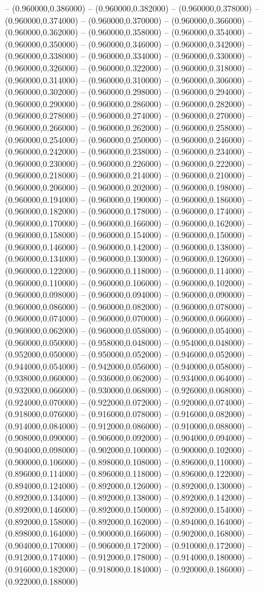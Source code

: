 -- (0.960000,0.386000) -- (0.960000,0.382000) -- (0.960000,0.378000) -- (0.960000,0.374000) -- (0.960000,0.370000) -- (0.960000,0.366000) -- (0.960000,0.362000) -- (0.960000,0.358000) -- (0.960000,0.354000) -- (0.960000,0.350000) -- (0.960000,0.346000) -- (0.960000,0.342000) -- (0.960000,0.338000) -- (0.960000,0.334000) -- (0.960000,0.330000) -- (0.960000,0.326000) -- (0.960000,0.322000) -- (0.960000,0.318000) -- (0.960000,0.314000) -- (0.960000,0.310000) -- (0.960000,0.306000) -- (0.960000,0.302000) -- (0.960000,0.298000) -- (0.960000,0.294000) -- (0.960000,0.290000) -- (0.960000,0.286000) -- (0.960000,0.282000) -- (0.960000,0.278000) -- (0.960000,0.274000) -- (0.960000,0.270000) -- (0.960000,0.266000) -- (0.960000,0.262000) -- (0.960000,0.258000) -- (0.960000,0.254000) -- (0.960000,0.250000) -- (0.960000,0.246000) -- (0.960000,0.242000) -- (0.960000,0.238000) -- (0.960000,0.234000) -- (0.960000,0.230000) -- (0.960000,0.226000) -- (0.960000,0.222000) -- (0.960000,0.218000) -- (0.960000,0.214000) -- (0.960000,0.210000) -- (0.960000,0.206000) -- (0.960000,0.202000) -- (0.960000,0.198000) -- (0.960000,0.194000) -- (0.960000,0.190000) -- (0.960000,0.186000) -- (0.960000,0.182000) -- (0.960000,0.178000) -- (0.960000,0.174000) -- (0.960000,0.170000) -- (0.960000,0.166000) -- (0.960000,0.162000) -- (0.960000,0.158000) -- (0.960000,0.154000) -- (0.960000,0.150000) -- (0.960000,0.146000) -- (0.960000,0.142000) -- (0.960000,0.138000) -- (0.960000,0.134000) -- (0.960000,0.130000) -- (0.960000,0.126000) -- (0.960000,0.122000) -- (0.960000,0.118000) -- (0.960000,0.114000) -- (0.960000,0.110000) -- (0.960000,0.106000) -- (0.960000,0.102000) -- (0.960000,0.098000) -- (0.960000,0.094000) -- (0.960000,0.090000) -- (0.960000,0.086000) -- (0.960000,0.082000) -- (0.960000,0.078000) -- (0.960000,0.074000) -- (0.960000,0.070000) -- (0.960000,0.066000) -- (0.960000,0.062000) -- (0.960000,0.058000) -- (0.960000,0.054000) -- (0.960000,0.050000) -- (0.958000,0.048000) -- (0.954000,0.048000) -- (0.952000,0.050000) -- (0.950000,0.052000) -- (0.946000,0.052000) -- (0.944000,0.054000) -- (0.942000,0.056000) -- (0.940000,0.058000) -- (0.938000,0.060000) -- (0.936000,0.062000) -- (0.934000,0.064000) -- (0.932000,0.066000) -- (0.930000,0.068000) -- (0.926000,0.068000) -- (0.924000,0.070000) -- (0.922000,0.072000) -- (0.920000,0.074000) -- (0.918000,0.076000) -- (0.916000,0.078000) -- (0.916000,0.082000) -- (0.914000,0.084000) -- (0.912000,0.086000) -- (0.910000,0.088000) -- (0.908000,0.090000) -- (0.906000,0.092000) -- (0.904000,0.094000) -- (0.904000,0.098000) -- (0.902000,0.100000) -- (0.900000,0.102000) -- (0.900000,0.106000) -- (0.898000,0.108000) -- (0.896000,0.110000) -- (0.896000,0.114000) -- (0.896000,0.118000) -- (0.896000,0.122000) -- (0.894000,0.124000) -- (0.892000,0.126000) -- (0.892000,0.130000) -- (0.892000,0.134000) -- (0.892000,0.138000) -- (0.892000,0.142000) -- (0.892000,0.146000) -- (0.892000,0.150000) -- (0.892000,0.154000) -- (0.892000,0.158000) -- (0.892000,0.162000) -- (0.894000,0.164000) -- (0.898000,0.164000) -- (0.900000,0.166000) -- (0.902000,0.168000) -- (0.904000,0.170000) -- (0.906000,0.172000) -- (0.910000,0.172000) -- (0.912000,0.174000) -- (0.912000,0.178000) -- (0.914000,0.180000) -- (0.916000,0.182000) -- (0.918000,0.184000) -- (0.920000,0.186000) -- (0.922000,0.188000) 